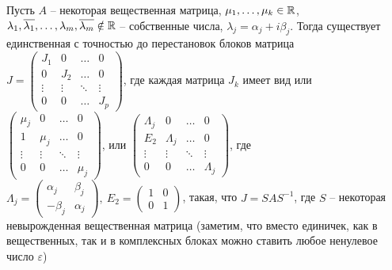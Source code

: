 \documentclass[12pt]{article}
\begin{document}
\begin{theo}{}
    Пусть $A$ -- некоторая вещественная матрица, $\mu_1, \ldots, \mu_k \in \mathbb R$, $\lambda_1, \overline{\lambda_1}, \ldots, \lambda_m, \overline{\lambda_m} \notin \mathbb R$ -- собственные числа, $\lambda_j = \alpha_j + i\beta_j$. Тогда существует единственная с точностью до перестановок блоков матрица $J = \begin{pmatrix}
        J_1 & 0 & \ldots & 0 \\
        0 & J_2 & \ldots & 0 \\
        \vdots & \vdots & \ddots & \vdots \\
        0 & 0 & \ldots & J_p
    \end{pmatrix}$, где каждая матрица $J_k$ имеет вид или $\begin{pmatrix}
        \mu_j & 0 & \ldots & 0 \\
        1 & \mu_j & \ldots & 0 \\
        \vdots & \vdots & \ddots & \vdots \\
        0 & 0 & \ldots & \mu_j
    \end{pmatrix}$, или $\begin{pmatrix}
        \Lambda_j & 0 & \ldots & 0 \\
        E_2 & \Lambda_j & \ldots & 0 \\
        \vdots & \vdots & \ddots & \vdots \\
        0 & 0 & \ldots & \Lambda_j
    \end{pmatrix}$, где $\Lambda_j = \begin{pmatrix}
        \alpha_j & \beta_j \\
        -\beta_j & \alpha_j
    \end{pmatrix},\ E_2 = \begin{pmatrix}
        1 & 0 \\
        0 & 1
    \end{pmatrix}$, такая, что $J = SAS^{-1}$, где $S$ -- некоторая невырожденная вещественная матрица (заметим, что вместо единичек, как в вещественных, так и в комплексных блоках можно ставить любое ненулевое число $\varepsilon$)
\end{theo}
\end{document}

